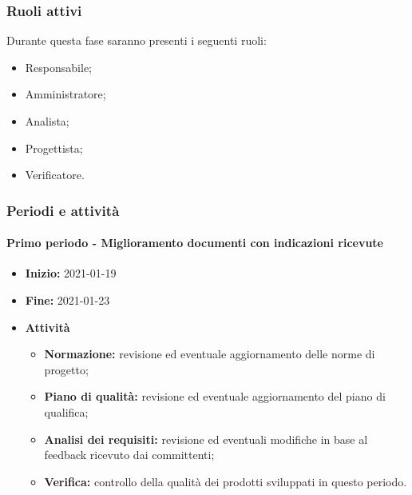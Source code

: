 \subsubsection{Ruoli attivi}
Durante questa fase saranno presenti i seguenti ruoli:
\begin{itemize}
    \item Responsabile;
    \item Amministratore;
    \item Analista;
    \item Progettista;
    \item Verificatore.
\end{itemize}

\subsubsection{Periodi e attività}

\paragraph[Primo periodo]{Primo periodo - \textnormal{Miglioramento documenti con indicazioni ricevute}}
\begin{itemize}
    \item [] \textbf{Inizio:} 2021-01-19
    \item [] \textbf{Fine:} 2021-01-23
    \item [] \textbf{Attività}
          \begin{itemize}
              \item \textbf{Normazione:} revisione ed eventuale aggiornamento delle norme di progetto;
              \item \textbf{Piano di qualità:} revisione ed eventuale aggiornamento del piano di qualifica;
              \item \textbf{Analisi dei requisiti:} revisione ed eventuali modifiche in base al feedback ricevuto dai committenti;
              \item \textbf{Verifica:} controllo della qualità dei prodotti sviluppati in questo periodo.
          \end{itemize}
\end{itemize}

